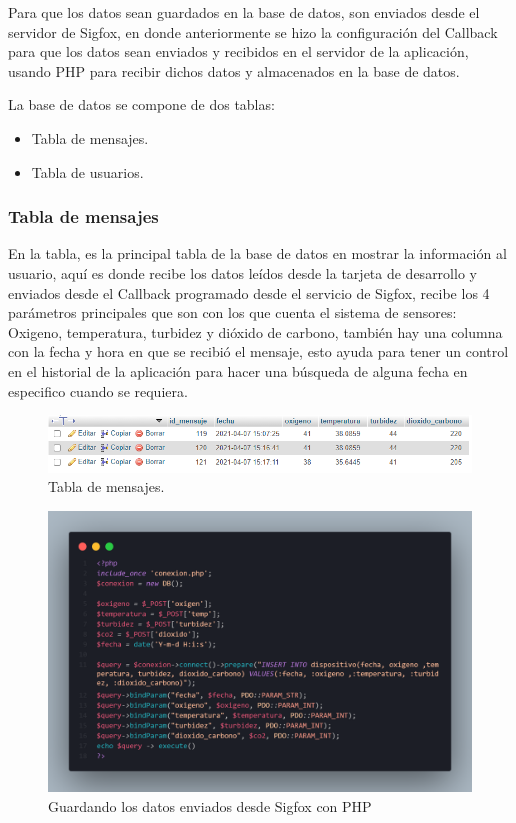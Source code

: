 \documentclass[12pt]{book}
\begin{document}
Para que los datos sean guardados en la base de datos, son enviados desde el servidor de Sigfox, en donde anteriormente se hizo la configuración del Callback para que los datos sean enviados y recibidos en el servidor de la aplicación, usando PHP para recibir dichos datos y almacenados en la base de datos.

La base de datos se compone de dos tablas:
\begin{itemize}
	\item Tabla de mensajes.
	\item Tabla de usuarios.
\end{itemize}

\subsubsection{Tabla de mensajes}

En la tabla, es la principal tabla de la base de datos en mostrar la información al usuario, aquí es donde recibe los datos leídos desde la tarjeta de desarrollo y enviados desde el Callback programado desde el servicio de Sigfox, recibe los 4 parámetros principales que son con los que cuenta el sistema de sensores: Oxigeno, temperatura, turbidez y dióxido de carbono, también hay una columna con la fecha y hora en que se recibió el mensaje, esto ayuda para tener un control en el historial de la aplicación para hacer una búsqueda de alguna fecha en especifico cuando se requiera.

\begin{figure}[h!]
	\centering
	\includegraphics[width=0.8\linewidth]{imagenes/dbmensajes}
	\caption{Tabla de mensajes.}
	\label{fig:Tabla de mensajes}
\end{figure}

\begin{figure}[h!]
	\centering
	\includegraphics[width=0.8\linewidth]{imagenes/guardar_datos}
	\caption{Guardando los datos enviados desde Sigfox con PHP}
	\label{fig:Guardando los datos enviados desde Sigfox con PHP}
\end{figure}
\end{document}
